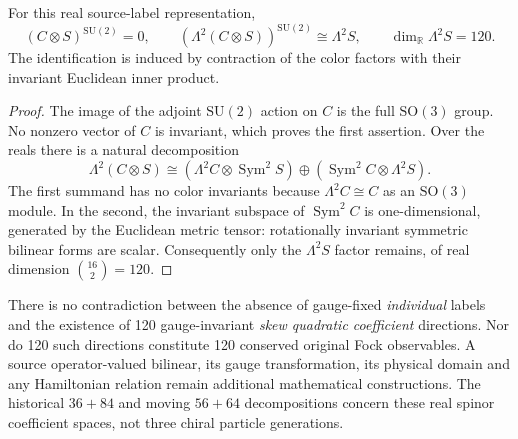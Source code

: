 \begin{proposition}\label{prop:color-quadratic-120}
For this real source-label representation,
\begin{equation}\label{eq:color-invariants-120}
 (C\otimes S)^{\mathrm{SU}(2)}=0,\qquad
 \left(\Lambda^2(C\otimes S)\right)^{\mathrm{SU}(2)}
 \cong\Lambda^2 S,\qquad
 \dim_{\mathbb R}\Lambda^2 S=120.
\end{equation}
The identification is induced by contraction of the color
factors with their invariant Euclidean inner product.
\end{proposition}
\begin{proof}
The image of the adjoint $\mathrm{SU}(2)$ action on
$C$ is the full $\mathrm{SO}(3)$ group. No nonzero
vector of $C$ is invariant, which proves the first
assertion. Over the reals there is a natural decomposition
\[
 \Lambda^2(C\otimes S)\cong
 (\Lambda^2 C\otimes\operatorname{Sym}^2 S)
 \oplus
 (\operatorname{Sym}^2 C\otimes\Lambda^2 S).
\]
The first summand has no color invariants because
$\Lambda^2 C\cong C$ as an $\mathrm{SO}(3)$ module.
In the second, the invariant subspace of
$\operatorname{Sym}^2 C$ is one-dimensional, generated
by the Euclidean metric tensor: rotationally invariant
symmetric bilinear forms are scalar. Consequently
only the $\Lambda^2 S$ factor remains, of real dimension
$\binom{16}{2}=120$.
\end{proof}

There is no contradiction between the absence of
gauge-fixed \emph{individual} labels and the existence
of 120 gauge-invariant \emph{skew quadratic coefficient}
directions. Nor do 120 such directions constitute
120 conserved original Fock observables. A source
operator-valued bilinear, its gauge transformation,
its physical domain and any Hamiltonian relation
remain additional mathematical constructions. The
historical $36+84$ and moving $56+64$ decompositions
concern these real spinor coefficient spaces, not
three chiral particle generations.



